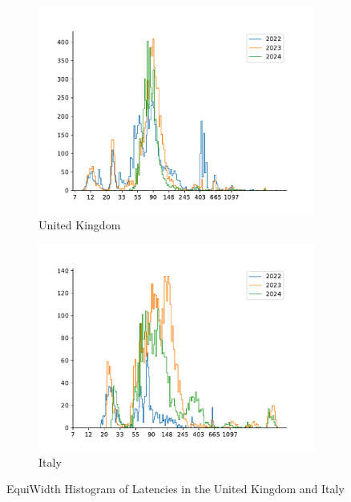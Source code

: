 \begin{figure}
	\centering
	\begin{subfigure}[b]{0.8\linewidth}
		\includegraphics[width=\linewidth]{chapters/4-results/latency/img/histogram_of_latencies_of_starlink_probes_in_united_kingdom.pdf}
		\caption{United Kingdom}
	\end{subfigure}
	\begin{subfigure}[b]{0.8\linewidth}
		\includegraphics[width=\linewidth]{chapters/4-results/latency/img/histogram_of_latencies_of_starlink_probes_in_italy.pdf}
		\caption{Italy}
	\end{subfigure}
	\caption{EquiWidth Histogram of Latencies in the United Kingdom and
		Italy}
	\label{fig:latency-histogram-3}
\end{figure}

